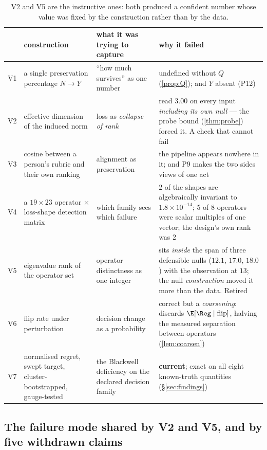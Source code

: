 \begin{table}[H]\centering\footnotesize
\begin{tabularx}{\textwidth}{P{0.7cm}P{3.4cm}P{4.4cm}Y}
\toprule
& construction & what it was trying to capture & why it failed\\
\midrule
V1 & a single preservation percentage $N\to Y$ & ``how much survives'' as one
number & undefined without $Q$ (\cref{prop:Q}); and $Y$ absent (P12)\\
V2 & effective dimension of the induced norm & loss as \emph{collapse of rank} &
read $3.00$ on every input \emph{including its own null} --- the probe bound
(\cref{thm:probe}) forced it. A check that cannot fail\\
V3 & cosine between a person's rubric and their own ranking & alignment as
preservation & the pipeline appears nowhere in it; and P9 makes the two sides
views of one act\\
V4 & a $19\times23$ operator $\times$ loss-shape detection matrix & which family
sees which failure & \num{2} of the shapes are algebraically invariant to
$1.8\times10^{-14}$; \num{5} of \num{8} operators were scalar multiples of one
vector; the design's own rank was \num{2}\\
V5 & eigenvalue rank of the operator set & operator distinctness as one integer &
sits \emph{inside} the span of three defensible nulls ($12.1$, $17.0$, $18.0$)
with the observation at $13$; the null \emph{construction} moved it more than the
data. Retired\\
V6 & flip rate under perturbation & decision change as a probability & correct but
a \emph{coarsening}: discards $\E[\Reg\mid\text{flip}]$, halving the measured
separation between operators (\cref{lem:coarsen})\\
\midrule
V7 & normalised regret, swept target, cluster-bootstrapped, gauge-tested & the
Blackwell deficiency on the declared decision family & \textbf{current}; exact on
all eight known-truth quantities (§\ref{sec:findings})\\
\bottomrule
\end{tabularx}
\caption{V2 and V5 are the instructive ones: both produced a confident number
whose value was fixed by the construction rather than by the data.}
\label{tab:attempts}
\end{table}

\subsection{The failure mode shared by V2 and V5, and by five withdrawn claims}

